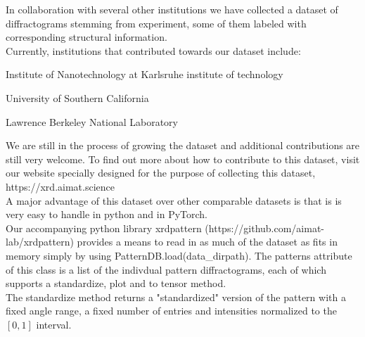 

In collaboration with several other institutions we have collected a dataset of diffractograms stemming from experiment, some of them labeled with corresponding structural information. \\
Currently, institutions that contributed towards our dataset include:
\item Institute of Nanotechnology at Karlsruhe institute of technology
\item University of Southern California
\item Lawrence Berkeley National Laboratory

We are still in the process of growing the dataset and additional contributions are still very welcome. 
To find out more about how to contribute to this dataset, visit our website specially designed for the purpose of collecting this dataset, https://xrd.aimat.science \\

A major advantage of this dataset over other comparable datasets is that is is very easy to handle in python and in PyTorch. \\
Our accompanying python library xrdpattern (https://github.com/aimat-lab/xrdpattern) provides a means to read in as much of the dataset as fits in memory simply by using PatternDB.load(data_dirpath). The patterns attribute of this class is a list of the indivdual pattern diffractograms, each of which supports a standardize, plot and to tensor method. \\
The standardize method returns a "standardized" version of the pattern with a fixed angle range, a fixed number of entries and intensities normalized to the $[0,1]$ interval.

